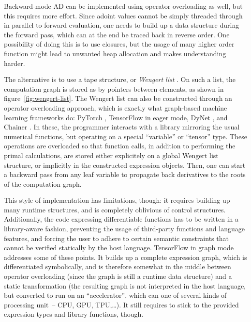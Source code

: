 Backward-mode AD can be implemented using operator overloading as well, but this requires more
effort.  Since adoint values cannot be simply threaded through in parallel to forward evaluation,
one needs to build up a data structure during the forward pass, which can at the end be traced back
in reverse order.  One possibility of doing this is to use closures, but the usage of many higher
order function might lead to unwanted heap allocation and makes understanding harder.

The alternative is to use a tape structure, or \emph{Wengert list} \parencite[][section
3]{baydin2018automatic}.  On such a list, the computation graph is stored as by pointers between
elements, as shown in figure~\ref{fig:wengert-list}.  The Wengert list can also be constructed
through an operator overloading approach, which is exactly what graph-based machine learning
frameworks do: PyTorch \parencite{paszke2017automatic}, TensorFlow \parencite{abadi2015tensorflow}
in eager mode, DyNet \parencite{neubig2017dynet}, and Chainer \parencite{tokui2015chainer}.  In
these, the programmer interacts with a library mirroring the usual numerical functions, but
operating on a special \enquote{variable} or \enquote{tensor} type.  These operations are overloaded
so that function calls, in addition to performing the primal calculations, are stored either
explicitely on a global Wengert list structure, or implicitly in the constructed expression objects.
Then, one can start a backward pass from any leaf variable to propagate back derivatives to the
roots of the computation graph.

This style of implementation has limitations, though: it requires building up many runtime
structures, and is completely oblivious of control structures.  Additionally, the code expressing
differentiable functions has to be written in a library-aware fashion, preventing the usage of
third-party functions and language features, and forcing the user to adhere to certain semantic
constraints that cannot be verified statically by the host language.  TensorFlow in graph mode
addresses some of these points.  It builds up a complete expression graph, which is differentiated
symbolically, and is therefore somewhat in the middle between operator overloading (since the graph
is still a runtime data structure) and a static transformation (the resulting graph is not
interpreted in the host language, but converted to run on an \enquote{accelerator}, which can one of
several kinds of processing unit~-- CPU, GPU, TPU,\ldots).  It still requires to stick to the
provided expression types and library functions, though.

